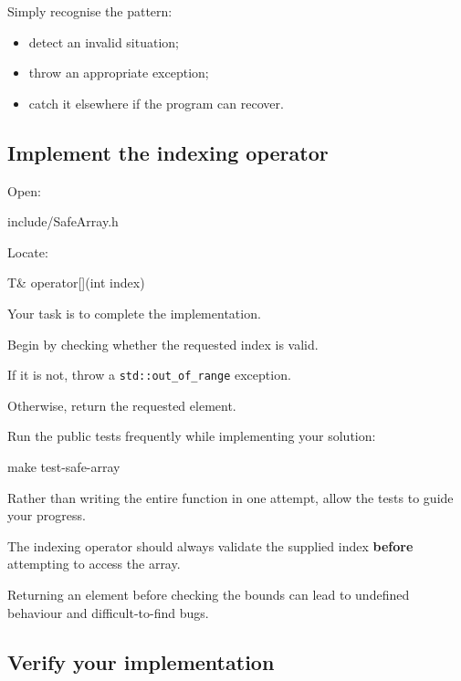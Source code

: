 \documentclass{csc2059practical}
\begin{document}
Simply recognise the pattern:

\begin{itemize}
    \item detect an invalid situation;
    \item throw an appropriate exception;
    \item catch it elsewhere if the program can recover.
\end{itemize}

\subsection{Implement the indexing operator}

Open:

\begin{terminal}
include/SafeArray.h
\end{terminal}

Locate:

\begin{cppcode}
T& operator[](int index)
\end{cppcode}

Your task is to complete the implementation.

Begin by checking whether the requested index is valid.

If it is not, throw a \texttt{std::out_of_range} exception.

Otherwise, return the requested element.

Run the public tests frequently while implementing your solution:

\begin{terminal}
make test-safe-array
\end{terminal}

Rather than writing the entire function in one attempt, allow the tests to guide your progress.

\begin{commonerror}
The indexing operator should always validate the supplied index \textbf{before} attempting to access the array.

Returning an element before checking the bounds can lead to undefined behaviour and difficult-to-find bugs.
\end{commonerror}

\subsection{Verify your implementation}
\end{document}
